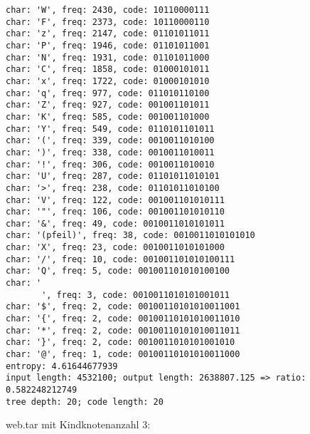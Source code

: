 \documentclass[11pt]{article} %
\theoremstyle{definition}
\begin{document}
\begin{enumerate}[(1)]
\begin{verbatim}
char: 'W', freq: 2430, code: 10110000111
char: 'F', freq: 2373, code: 10110000110
char: 'z', freq: 2147, code: 01101011011
char: 'P', freq: 1946, code: 01101011001
char: 'N', freq: 1931, code: 01101011000
char: 'C', freq: 1858, code: 01000101011
char: 'x', freq: 1722, code: 01000101010
char: 'q', freq: 977, code: 011010110100
char: 'Z', freq: 927, code: 001001101011
char: 'K', freq: 585, code: 001001101000
char: 'Y', freq: 549, code: 0110101101011
char: '(', freq: 339, code: 0010011010100
char: ')', freq: 338, code: 0010011010011
char: '!', freq: 306, code: 0010011010010
char: 'U', freq: 287, code: 01101011010101
char: '>', freq: 238, code: 01101011010100
char: 'V', freq: 122, code: 001001101010111
char: '"', freq: 106, code: 001001101010110
char: '&', freq: 49, code: 0010011010101011
char: '(pfeil)', freq: 38, code: 0010011010101010
char: 'X', freq: 23, code: 0010011010101000
char: '/', freq: 10, code: 001001101010100111
char: 'Q', freq: 5, code: 001001101010100100
char: '
       ', freq: 3, code: 0010011010101001011
char: '$', freq: 2, code: 00100110101010011001
char: '{', freq: 2, code: 00100110101010011010
char: '*', freq: 2, code: 00100110101010011011
char: '}', freq: 2, code: 0010011010101001010
char: '@', freq: 1, code: 00100110101010011000
entropy: 4.61644677939
input length: 4532100; output length: 2638807.125 => ratio: 0.582248212749
tree depth: 20; code length: 20
\end{verbatim}

web.tar mit Kindknotenanzahl 3:


\end{enumerate}
\end{document}
